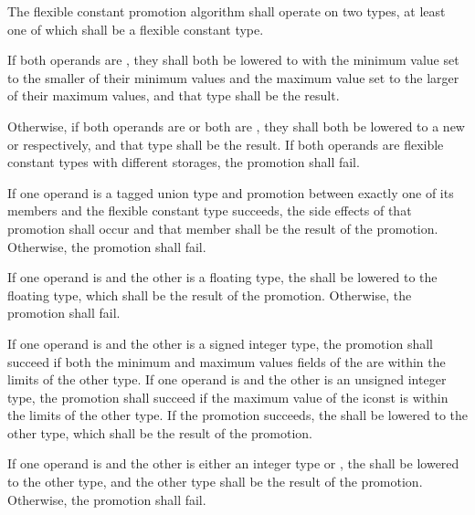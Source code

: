 
\specsubitem
The flexible constant promotion algorithm shall operate on two types, at least
one of which shall be a flexible constant type.

\specsubitem
If both operands are , they shall both be lowered to
 with the minimum value set to the smaller of their
minimum values and the maximum value set to the larger of their maximum values,
and that type shall be the result.

\specsubitem
Otherwise, if both operands are  or both are ,
they shall both be lowered to a new  or 
respectively, and that type shall be the result. If both operands are flexible
constant types with different storages, the promotion shall fail.

\specsubitem
If one operand is a tagged union type and promotion between exactly one of its
members and the flexible constant type succeeds, the side effects of that
promotion shall occur and that member shall be the result of the promotion.
Otherwise, the promotion shall fail.

\specsubitem
If one operand is  and the other is a floating type, the
 shall be lowered to the floating type, which shall be the
result of the promotion. Otherwise, the promotion shall fail.


\specsubitem
If one operand is  and the other is a signed integer type, the
promotion shall succeed if both the minimum and maximum values fields of the
 are within the limits of the other type. If one operand is
 and the other is an unsigned integer type, the promotion shall
succeed if the maximum value of the iconst is within the limits of the other
type. If the promotion succeeds, the  shall be lowered to the
other type, which shall be the result of the promotion.


\specsubitem
If one operand is  and the other is either an integer type or
, the  shall be lowered to the other type, and
the other type shall be the result of the promotion. Otherwise, the promotion
shall fail.
